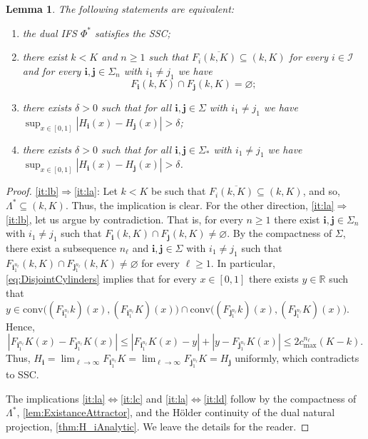 \documentclass[11pt,a4paper]{article}
\def\cref#1{\ref{#1}}%
\newtheorem{lemma}[theorem]{Lemma}
\theoremstyle{definition}
\theoremstyle{remark}
\newcommand{\0}{\mathbf{0}}
\newcommand{\bi}{\mathbf{i}}
\newcommand{\bj}{\mathbf{j}}
\numberwithin{equation}{section}
\begin{document}
\begin{lemma}\label{lem:SSCEequiv}
The following statements are equivalent: 
\begin{enumerate}[label=(\alph*)]
\item\label{it:la} the dual IFS $\Phi^*$ satisfies the SSC;
\item\label{it:lb} there exist $k<K$ and $n\geq1$ such that $F_{i}\overline{(k,K)}\subseteq(k,K)$ for every
  $i\in\mathcal{I}$ and for every $\bi,\bj\in\Sigma_n$ with $i_1\neq j_1$ we have
\begin{equation*}
	F_{\bi}(k,K)\cap F_{\bj}(k,K)=\varnothing; 
\end{equation*}
\item\label{it:lc} there exists $\delta>0$ such that for all $\bi,\bj \in\Sigma$ with $i_1\neq j_1$ we have
  $\sup_{x\in[0,1]} |H_{\bi}(x) - H_{\bj}(x)| > \delta$;
\item\label{it:ld} there exists $\delta>0$ such that for all $\bi,\bj \in\Sigma_*$ with $i_1\neq j_1$ we have
  $\sup_{x\in[0,1]} |H_{\bi}(x) - H_{\bj}(x)| > \delta$.
\end{enumerate}
\end{lemma}


\begin{proof}
  \cref{it:lb}$\Rightarrow$\cref{it:la}: Let $k<K$ be such that
  $F_{i}\overline{(k,K)}\subseteq(k,K)$, and so, $\Lambda^*\subseteq(k,K)$. Thus, the
  implication  is clear. For the other direction, \cref{it:la}$\Rightarrow$\cref{it:lb}, let us
  argue by contradiction. That is, for every $n\geq1$ there exist $\bi,\bj\in\Sigma_n$ with
  $i_1\neq j_1$ such that $F_{\bi}(k,K)\cap F_{\bj}(k,K)\neq\varnothing$. By the compactness
  of $\Sigma$, there exist a subsequence $n_\ell$ and $\bi,\bj\in\Sigma$ with $i_1\neq j_1$
  such that $F_{\bi_1^{n_\ell}}(k,K)\cap F_{\bj_1^{n_\ell}}(k,K)\neq\varnothing$ for every
  $\ell\geq1$. In particular, \cref{eq:DisjointCylinders} implies that for every $x\in[0,1]$
  there exists $y\in\mathbb{R}$ such that $y\in\mathrm{conv}\big((F_{\bi_1^{n_\ell}}k)(x),
    (F_{\bi_1^{n_\ell}}K)(x)\big) \cap \mathrm{conv}\big((F_{\bj_1^{n_\ell}}k)(x),
  (F_{\bj_1^{n_\ell}}K)(x)\big)$. Hence,
  $$
  |F_{\bi_1^{n_\ell}}K(x)-F_{\bj_1^{n_\ell}}K(x)|\leq
  |F_{\bi_1^{n_\ell}}K(x)-y|+|y-F_{\bj_1^{n_\ell}}K(x)|\leq 2c_{\max}^{n_\ell}(K-k).
  $$
  Thus,
  $H_{\bi}=\lim_{\ell\to\infty}F_{\bi_1^{n_\ell}}K=\lim_{\ell\to\infty}F_{\bj_1^{n_\ell}}K=H_{\bj}$
  uniformly, which contradicts to SSC.

  The implications \cref{it:la}$\Leftrightarrow$\cref{it:lc} and
  \cref{it:la}$\Leftrightarrow$\cref{it:ld} follow by the compactness of $\Lambda^*$,
  \cref{lem:ExistanceAttractor}, and the H\"older continuity of the dual natural projection,
  \cref{thm:H_iAnalytic}. We leave the details for the reader.
\end{proof}
\end{document}
